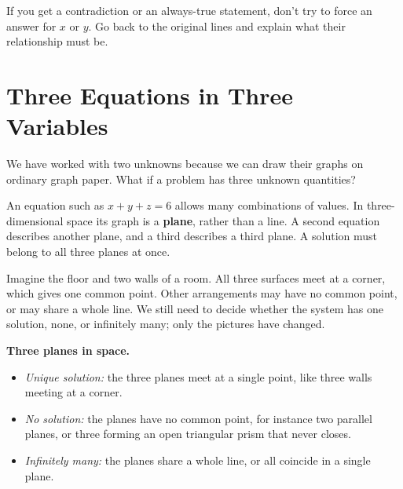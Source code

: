 \documentclass[12pt]{book}
\begin{document}
If you get a contradiction or an always-true statement, don't try
to force an answer for $x$ or $y$. Go back to the original lines and
explain what their relationship must be.

\section{Three Equations in Three Variables}

We have worked with two unknowns because we can draw their graphs on
ordinary graph paper. What if a problem has three unknown quantities?

An equation such as $x+y+z=6$ allows many combinations of values. In
three-dimensional space its graph is a \textbf{plane}, rather than a line.
A second equation describes another plane, and a third describes a third
plane. A solution must belong to all three planes at once.

Imagine the floor and two walls of a room. All three surfaces meet at a
corner, which gives one common point. Other arrangements may have no
common point, or may share a whole line. We still need to decide whether
the system has one solution, none, or infinitely many; only the
pictures have changed.


\begin{keyidea}
\textbf{Three planes in space.}
\begin{itemize}\setlength{\itemsep}{2pt}
  \item \emph{Unique solution:} the three planes meet at a single point, like three
        walls meeting at a corner.
  \item \emph{No solution:} the planes have no common point, for instance two
        parallel planes, or three forming an open triangular prism that never closes.
  \item \emph{Infinitely many:} the planes share a whole line, or all coincide in a
        single plane.
\end{itemize}
\end{keyidea}
\end{document}
